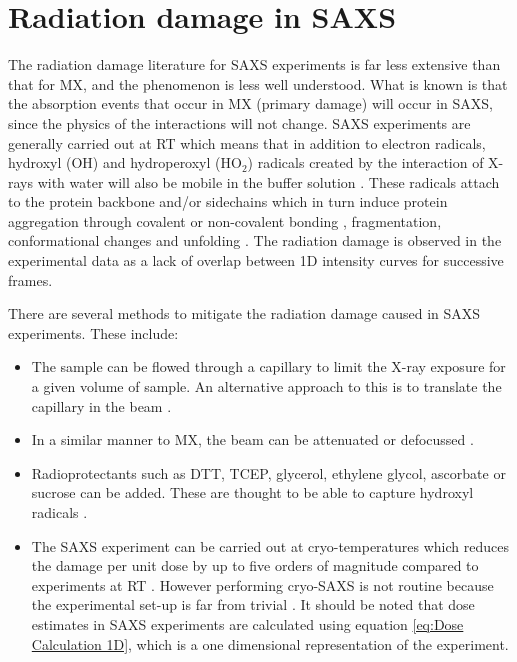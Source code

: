 \section{Radiation damage in SAXS}
\label{sec:Radiation damage in SAXS}
    The radiation damage literature for SAXS experiments is far less extensive than that for MX, and the phenomenon is less well understood.
    What is known is that the absorption events that occur in MX (primary damage) will occur in SAXS, since the physics of the interactions will not change.
    SAXS experiments are generally carried out at RT which means that in addition to electron radicals, hydroxyl (OH) and hydroperoxyl (HO$_2$) radicals created by the interaction of X-rays with water will also be mobile in the buffer solution \cite{jeffries2015limiting,garrison1987reaction}.
    These radicals attach to the protein backbone and/or sidechains which in turn induce protein aggregation through covalent or non-covalent bonding \cite{kuwamoto2004radiation}, fragmentation, conformational changes and unfolding \cite{hopkins2016quantifying}.
    The radiation damage is observed in the experimental data as a lack of overlap between 1D intensity curves for successive frames.

    There are several methods to mitigate the radiation damage caused in SAXS experiments. These include:
    \begin{itemize}
        \item The sample can be flowed through a capillary to limit the X-ray exposure for a given volume of sample.
        An alternative approach to this is to translate the capillary in the beam \cite{jeffries2015limiting}.
        \item In a similar manner to MX, the beam can be attenuated or defocussed \cite{jeffries2015limiting}.
        \item Radioprotectants such as DTT, TCEP, glycerol, ethylene glycol, ascorbate or sucrose can be added.
        These are thought to be able to capture hydroxyl radicals \cite{grishaev2012sample}.
        \item The SAXS experiment can be carried out at cryo-temperatures which reduces the damage per unit dose by up to five orders of magnitude compared to experiments at RT \cite{meisburger2013breaking}.
        However performing cryo-SAXS is not routine because the experimental set-up is far from trivial \cite{jeffries2015limiting}.
        It should be noted that dose estimates in SAXS experiments are calculated using equation \ref{eq:Dose Calculation 1D}, which is a one dimensional representation of the experiment.
    \end{itemize}

